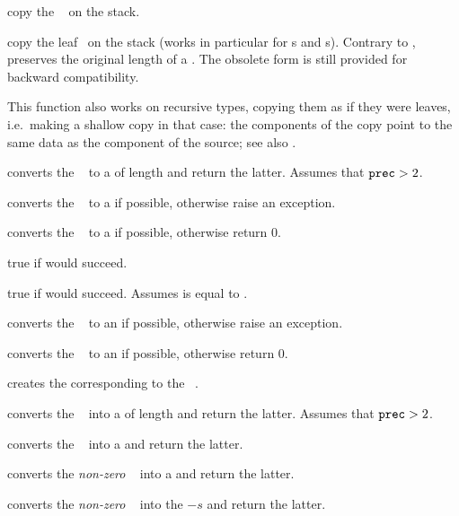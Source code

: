  copy the ~ on the stack.

 copy the leaf~ on the
stack (works in particular for s and s).
Contrary to ,  preserves the original
length of a . The obsolete form 
is still provided for backward compatibility.

This function also works on recursive types, copying them as if they were leaves,
i.e.~making a shallow copy in that case: the components of the copy point to the
same data as the component of the source; see also .


 converts the ~ to a
 of length  and return the latter.
Assumes that ${\tt prec} > 2$.

 converts the ~ to a  if
possible, otherwise raise an exception.

 converts the ~ to a  if
possible, otherwise return $0$.

 true if  would succeed.

 true if  would succeed.
Assumes  is equal to .

 converts the ~ to an  if
possible, otherwise raise an exception.

 converts the ~ to an
 if possible, otherwise return $0$.

 creates the  corresponding to the
~.

 converts the ~ into a
 of length  and return the latter. Assumes that
${\tt prec} > 2$.

 converts the ~ into a 
and return the latter.

 converts the \emph{non-zero} ~
into a  and return the latter.

 converts the \emph{non-zero} ~
into the  $-s$ and return the latter.


